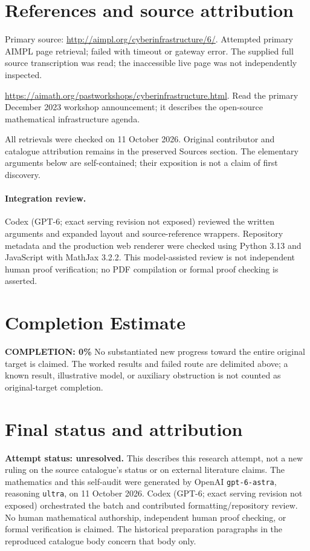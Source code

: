 \documentclass[11pt]{article}
\begin{document}
\section{References and source attribution}
Primary source: \url{http://aimpl.org/cyberinfrastructure/6/}. Attempted primary AIMPL page retrieval; failed with timeout or gateway error. The supplied full source transcription was read; the inaccessible live page was not independently inspected.

\url{https://aimath.org/pastworkshops/cyberinfrastructure.html}. Read the primary December 2023 workshop announcement; it describes the open-source mathematical infrastructure agenda.

All retrievals were checked on 11 October 2026. Original contributor and catalogue attribution remains in the preserved Sources section. The elementary arguments below are self-contained; their exposition is not a claim of first discovery.


\paragraph{Integration review.} Codex (GPT-6; exact serving revision not exposed) reviewed the written arguments and expanded layout and source-reference wrappers. Repository metadata and the production web renderer were checked using Python 3.13 and JavaScript with MathJax 3.2.2. This model-assisted review is not independent human proof verification; no PDF compilation or formal proof checking is asserted.

\section{Completion Estimate}
\noindent\textbf{COMPLETION: 0\%}
No substantiated new progress toward the entire original target is claimed. The worked results and failed route are delimited above; a known result, illustrative model, or auxiliary obstruction is not counted as original-target completion.

\section{Final status and attribution}
\textbf{Attempt status: unresolved.} This describes this research attempt, not a new ruling on the source catalogue's status or on external literature claims.
The mathematics and this self-audit were generated by OpenAI \texttt{gpt-6-astra}, reasoning \texttt{ultra}, on 11 October 2026. Codex (GPT-6; exact serving revision not exposed) orchestrated the batch and contributed formatting/repository review. No human mathematical authorship, independent human proof checking, or formal verification is claimed. The historical preparation paragraphs in the reproduced catalogue body concern that body only.
\end{document}
